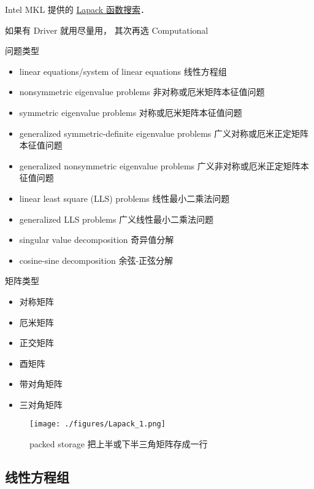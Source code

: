 
\begin{issues}
\issueDraft
\end{issues}


Intel MKL 提供的 \href{https://www.intel.com/content/www/us/en/developer/tools/oneapi/onemkl-function-finding-advisor.html}{Lapack 函数搜索}．

如果有 Driver 就用尽量用， 其次再选 Computational

问题类型
\begin{itemize}
\item linear equations/system of linear equations 线性方程组
\item nonsymmetric eigenvalue problems 非对称或厄米矩阵本征值问题
\item symmetric eigenvalue problems 对称或厄米矩阵本征值问题
\item generalized symmetric-definite eigenvalue problems 广义对称或厄米正定矩阵本征值问题
\item generalized nonsymmetric eigenvalue problems 广义非对称或厄米正定矩阵本征值问题
\item linear least square (LLS) problems 线性最小二乘法问题
\item generalized LLS problems 广义线性最小二乘法问题
\item singular value decomposition 奇异值分解
\item cosine-sine decomposition 余弦-正弦分解
\end{itemize}

矩阵类型
\begin{itemize}
\item 对称矩阵
\item 厄米矩阵
\item 正交矩阵
\item 酉矩阵
\item 带对角矩阵
\item 三对角矩阵
\end{itemize}

\begin{figure}[ht]
\centering
\texttt{[image: ./figures/Lapack\_1.png]}
\caption{packed storage 把上半或下半三角矩阵存成一行} \label{Lapack_fig1}
\end{figure}


\subsection{线性方程组}
